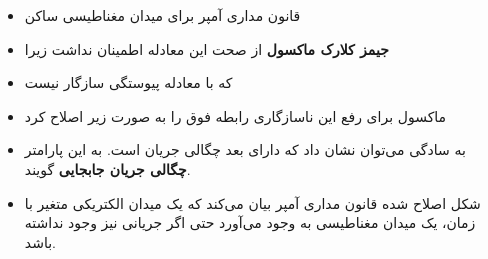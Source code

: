 \begin{ELunit}

\begin{itemize}
\tightlist
\item
  قانون مداری آمپر برای میدان مغناطیسی ساکن
\end{itemize}


\begin{itemize}
\tightlist
\item
  \textbf{جیمز کلارک ماکسول} از صحت این معادله اطمینان نداشت زیرا
\end{itemize}


\begin{itemize}
\tightlist
\item
  که با معادله پیوستگی سازگار نیست
\end{itemize}


\begin{itemize}
\tightlist
\item
  ماکسول برای رفع این ناسازگاری رابطه فوق را به صورت زیر اصلاح کرد
\end{itemize}


\end{ELunit}

\begin{ELimportant}{}


\end{ELimportant}

\begin{ELunit}

\begin{itemize}
\tightlist
\item
  به سادگی می‌توان نشان داد که  دارای بعد چگالی جریان است. به این پارامتر \textbf{چگالی جریان جابجایی} گویند.
\item
  شکل اصلاح شده قانون مداری آمپر بیان می‌کند که یک میدان الکتریکی متغیر با زمان، یک میدان مغناطیسی به وجود می‌آورد حتی اگر جریانی نیز وجود نداشته باشد.
\end{itemize}

\end{ELunit}

